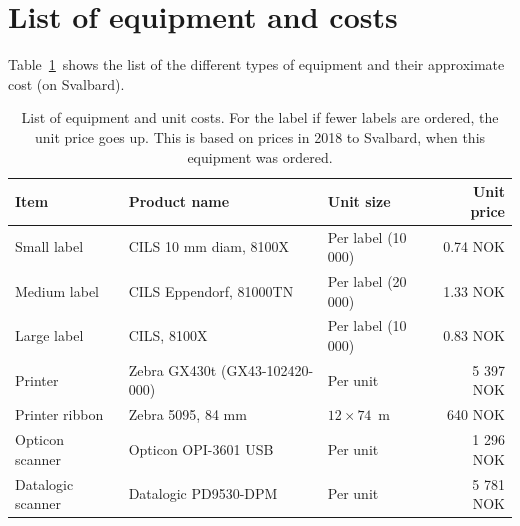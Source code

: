 \documentclass[a4paper,english, 11pt]{article}
\begin{document}
\section{List of equipment and costs} %
\label{sec:Costs}
Table~\ref{tab:costs} shows the list of the different types of equipment and their approximate cost (on Svalbard). 
\begin{table}[htb]
    \caption{\label{tab:costs}List of equipment and unit costs. For the label if fewer labels are ordered, the unit price goes up. This is based on prices in 2018 to Svalbard, when this equipment was ordered.}
    \begin{tabular}{lllr}
        \hline
        \textbf{Item} & \textbf{Product name} & \textbf{Unit size} & \textbf{Unit price} \\ \hline
        Small label     & CILS 10 mm diam, 8100X  & Per label  (10 000)   & 0.74 NOK  \\ 
        Medium label    & CILS Eppendorf, 81000TN & Per label  (20 000)   & 1.33 NOK  \\ 
        Large label     & CILS, 8100X             & Per label  (10 000)   & 0.83 NOK  \\ 
        Printer         & Zebra GX430t (GX43-102420-000)            & Per unit              & 5 397 NOK  \\ 
        Printer ribbon  & Zebra 5095, 84 mm &     $ 12\times74$~m         & 640  NOK   \\ 
        Opticon scanner & Opticon OPI-3601 USB    & Per unit              & 1 296 NOK  \\ 
        Datalogic scanner & Datalogic PD9530-DPM  & Per unit              & 5 781 NOK  \\ 
        \hline
    \end{tabular}
\end{table}


\end{document}
